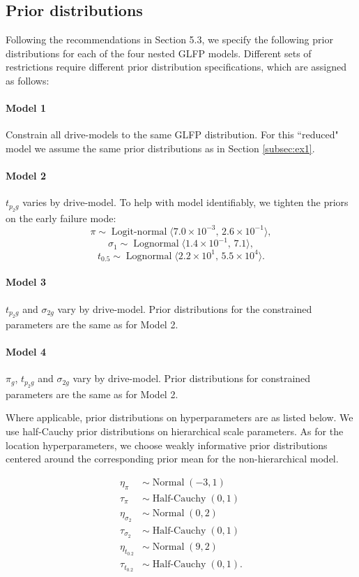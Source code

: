 \documentclass[12pt]{article}
\newcommand{\op}{\operatorname}
\begin{document}
\subsection{Prior distributions}
\label{sec:Prior distributions}
Following the recommendations in Section 5.3, we specify the following prior distributions for each of the four nested GLFP models. Different sets of restrictions require different prior distribution specifications, which are assigned as follows:

\paragraph{Model 1} Constrain all drive-models to the same GLFP distribution. For this ``reduced" model we assume the same prior distributions as in Section \ref{subsec:ex1}.

\paragraph{Model 2} $t_{p_{2}g}$ varies by drive-model. To help with model identifiably, we tighten the priors on the early failure mode:
$$ \pi \sim \op{Logit-normal}\langle 7.0\times 10^{-3},\, 2.6 \times 10^{-1} \rangle,$$
$$\sigma_1 \sim \op{Lognormal}\langle 1.4 \times 10^{-1},\, 7.1\rangle,$$ 
$$t_{0.5} \sim \op{Lognormal} \langle 2.2 \times 10^1,\, 5.5 \times 10^{4} \rangle.$$

\paragraph{Model 3} $t_{p_{2}g}$ and $\sigma_{2g}$ vary by drive-model. Prior distributions for the constrained parameters are the same as for Model 2.

\paragraph{Model 4} $\pi_g$, $t_{p_{2}g}$ and $\sigma_{2g}$ vary by drive-model. Prior distributions for constrained parameters are the same as for Model 2.


Where applicable, prior distributions on hyperparameters are as listed below. We use half-Cauchy prior distributions on hierarchical scale parameters. As for the location hyperparameters, we choose weakly informative prior distributions centered around the corresponding prior mean for the non-hierarchical model.


\begin{align*}
  \eta_{\pi} & \sim \op{Normal}(-3, 1)\\
  \tau_{\pi} & \sim \op{Half-Cauchy}(0, 1)\\
  \eta_{\sigma_2} & \sim \op{Normal}(0, 2)\\
  \tau_{\sigma_2} & \sim \op{Half-Cauchy}(0, 1)\\
  \eta_{t_{0.2}} & \sim \op{Normal}(9, 2)\\
  \tau_{t_{0.2}} & \sim \op{Half-Cauchy}(0, 1).
 \end{align*} 
\end{document}
